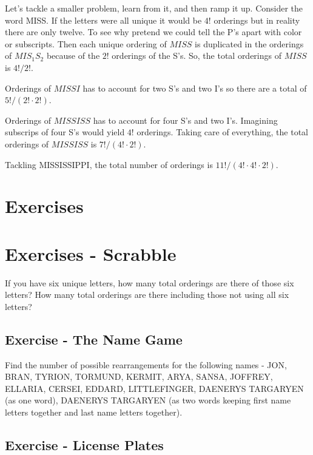 \documentclass[]{book}
\theoremstyle{definition}
\theoremstyle{definition}
\theoremstyle{definition}
\theoremstyle{remark}
\begin{document}
Let's tackle a smaller problem, learn from it, and then ramp it up.
Consider the word MISS. If the letters were all unique it would be
\(4!\) orderings but in reality there are only twelve. To see why
pretend we could tell the P's apart with color or subscripts. Then each
unique ordering of \(MISS\) is duplicated in the orderings of
\(MIS_{1}S_{2}\) because of the \(2!\) orderings of the S's. So, the
total orderings of \(MISS\) is \(4!/2!\).

Orderings of \(MISSI\) has to account for two S's and two I's so there
are a total of \(5!/(2! \cdot 2!)\).

Orderings of \(MISSISS\) has to account for four S's and two I's.
Imagining subscrips of four S's would yield \(4!\) orderings. Taking
care of everything, the total orderings of \(MISSISS\) is
\(7!/(4! \cdot 2!)\).

Tackling MISSISSIPPI, the total number of orderings is
\(11!/(4! \cdot 4! \cdot 2!)\).

\section{Exercises}\label{exercises}

\section{Exercises - Scrabble}\label{exercises---scrabble}

If you have six unique letters, how many total orderings are there of
those six letters? How many total orderings are there including those
not using all six letters?

\subsection{Exercise - The Name Game}\label{exercise---the-name-game}

Find the number of possible rearrangements for the following names -
JON, BRAN, TYRION, TORMUND, KERMIT, ARYA, SANSA, JOFFREY, ELLARIA,
CERSEI, EDDARD, LITTLEFINGER, DAENERYS TARGARYEN (as one word), DAENERYS
TARGARYEN (as two words keeping first name letters together and last
name letters together).

\subsection{Exercise - License Plates}\label{exercise---license-plates}
\end{document}

